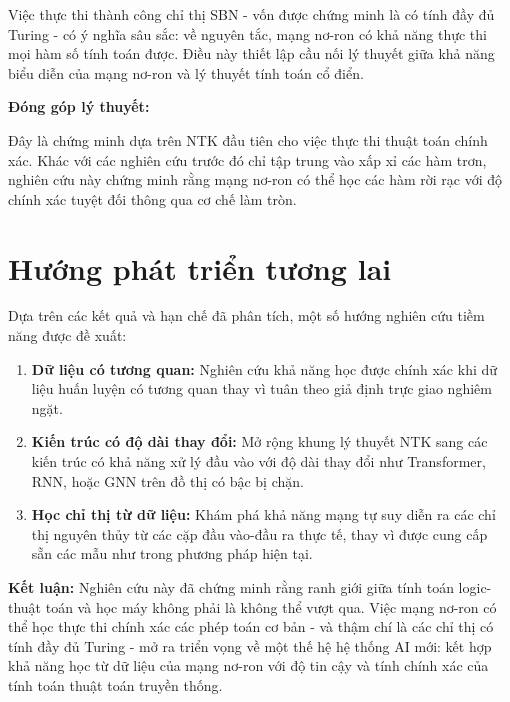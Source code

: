 \vspace{0.2cm}

Việc thực thi thành công chỉ thị SBN - vốn được chứng minh là có tính đầy đủ Turing - có ý nghĩa sâu sắc: về nguyên tắc, mạng nơ-ron có khả năng thực thi mọi hàm số tính toán được. Điều này thiết lập cầu nối lý thuyết giữa khả năng biểu diễn của mạng nơ-ron và lý thuyết tính toán cổ điển.

\vspace{0.2cm}

\textbf{Đóng góp lý thuyết:}

\vspace{0.2cm}

Đây là chứng minh dựa trên NTK đầu tiên cho việc thực thi thuật toán chính xác. Khác với các nghiên cứu trước đó chỉ tập trung vào xấp xỉ các hàm trơn, nghiên cứu này chứng minh rằng mạng nơ-ron có thể học các hàm rời rạc với độ chính xác tuyệt đối thông qua cơ chế làm tròn.

\section{Hướng phát triển tương lai}

Dựa trên các kết quả và hạn chế đã phân tích, một số hướng nghiên cứu tiềm năng được đề xuất:

\begin{enumerate}
    \item \textbf{Dữ liệu có tương quan:} Nghiên cứu khả năng học được chính xác khi dữ liệu huấn luyện có tương quan thay vì tuân theo giả định trực giao nghiêm ngặt.
    
    \item \textbf{Kiến trúc có độ dài thay đổi:} Mở rộng khung lý thuyết NTK sang các kiến trúc có khả năng xử lý đầu vào với độ dài thay đổi như Transformer, RNN, hoặc GNN trên đồ thị có bậc bị chặn.
    
    \item \textbf{Học chỉ thị từ dữ liệu:} Khám phá khả năng mạng tự suy diễn ra các chỉ thị nguyên thủy từ các cặp đầu vào-đầu ra thực tế, thay vì được cung cấp sẵn các mẫu như trong phương pháp hiện tại.
\end{enumerate}

\vspace{1em}

\textbf{Kết luận:} Nghiên cứu này đã chứng minh rằng ranh giới giữa tính toán logic-thuật toán và học máy không phải là không thể vượt qua. Việc mạng nơ-ron có thể học thực thi chính xác các phép toán cơ bản - và thậm chí là các chỉ thị có tính đầy đủ Turing - mở ra triển vọng về một thế hệ hệ thống AI mới: kết hợp khả năng học từ dữ liệu của mạng nơ-ron với độ tin cậy và tính chính xác của tính toán thuật toán truyền thống.
